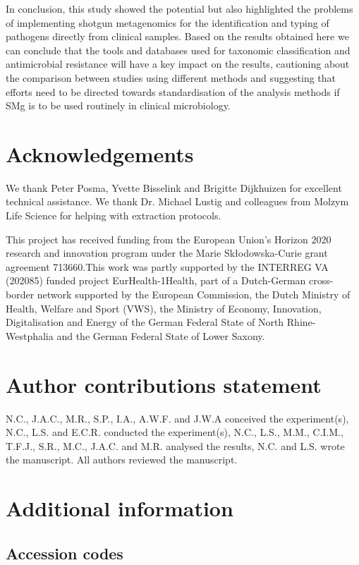 In conclusion, this study showed the potential but also highlighted the problems of implementing shotgun metagenomics for the identification and typing of pathogens directly from clinical samples. Based on the results obtained here we can conclude that the tools and databases used for taxonomic classification and antimicrobial resistance will have a key impact on the results, cautioning about the comparison between studies using different methods and suggesting that efforts need to be directed towards standardisation of the analysis methods if SMg is to be used routinely in clinical microbiology.

\section{Acknowledgements}

We thank Peter Posma, Yvette Bisselink and Brigitte Dijkhuizen for excellent technical assistance. We thank Dr. Michael Lustig and colleagues from Molzym Life Science for helping with extraction protocols.

This project has received funding from the European Union’s Horizon 2020 research and innovation program under the Marie Skłodowska-Curie grant agreement 713660.This work was partly supported by the INTERREG VA (202085) funded project EurHealth-1Health, part of a Dutch-German cross-border network supported by the European Commission, the Dutch Ministry of Health, Welfare and Sport (VWS), the Ministry of Economy, Innovation, Digitalisation and Energy of the German Federal State of North Rhine-Westphalia and the German Federal State of Lower Saxony.

\section{Author contributions statement}

N.C., J.A.C., M.R., S.P., I.A., A.W.F. and J.W.A conceived the experiment(s), N.C., L.S. and E.C.R. conducted the experiment(s), N.C., L.S., M.M., C.I.M., T.F.J., S.R., M.C., J.A.C. and M.R. analysed the results, N.C. and L.S. wrote the manuscript. All authors reviewed the manuscript.

\section{Additional information}

\subsection{Accession codes} \label{ch2_supmaterial}

